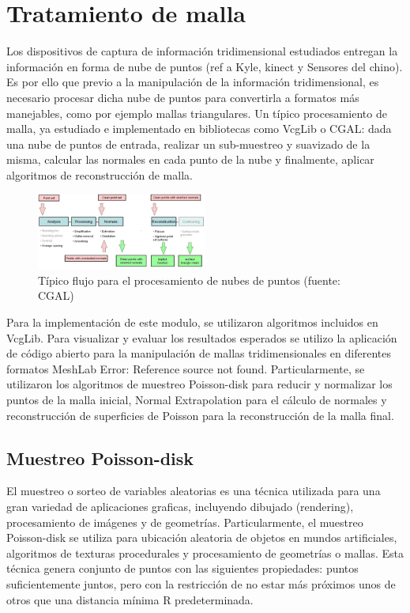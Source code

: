 \section{Tratamiento de malla}

Los dispositivos de captura de información tridimensional estudiados entregan la información en forma de nube de puntos (ref a Kyle, kinect  y Sensores del chino). Es por ello que previo a la manipulación de la información tridimensional, es necesario procesar dicha nube de puntos para convertirla a formatos más manejables, como por ejemplo mallas triangulares.
Un típico procesamiento de malla, ya estudiado e implementado en bibliotecas como VcgLib\cite{VCGLib} o CGAL\cite{CGAL}: dada una nube de puntos de entrada, realizar un sub-muestreo y suavizado de la misma, calcular las normales en cada punto de la nube y finalmente, aplicar algoritmos de reconstrucción de malla.

\begin{figure}[H]
  \centering
    \includegraphics[width=0.5\textwidth]{./Cap6_reconstruccion/malla-flow.png}
  \caption{Típico flujo para el procesamiento de nubes de puntos (fuente: CGAL\cite{CGAL})}
  \label{fig:Mesh-CGAL}
\end{figure}

Para la implementación de este modulo, se utilizaron algoritmos incluidos en VcgLib. Para visualizar y evaluar los resultados esperados se utilizo la aplicación de código abierto para la manipulación de mallas tridimensionales en diferentes formatos MeshLab Error: Reference source not found. Particularmente, se utilizaron los algoritmos de muestreo Poisson-disk para reducir y normalizar los puntos de la malla inicial, Normal Extrapolation para el cálculo de normales y reconstrucción de superficies de Poisson para la reconstrucción de la malla final.

\subsection{Muestreo Poisson-disk}

El muestreo o sorteo de variables aleatorias es una técnica utilizada para una gran variedad de aplicaciones graficas, incluyendo dibujado (rendering), procesamiento de imágenes y de geometrías.
Particularmente, el muestreo Poisson-disk se utiliza para ubicación aleatoria de objetos en mundos artificiales, algoritmos de texturas procedurales y procesamiento de geometrías o mallas. Esta técnica genera conjunto de puntos con las siguientes propiedades: puntos suficientemente juntos, pero con la restricción de no estar más próximos unos de otros que una distancia mínima R predeterminada.

